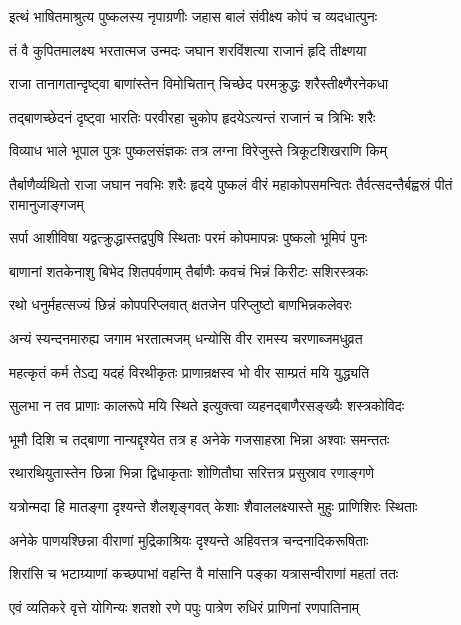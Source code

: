 \twolineshloka
{इत्थं भाषितमाश्रुत्य पुष्कलस्य नृपाग्रणीः}
{जहास बालं संवीक्ष्य कोपं च व्यदधात्पुनः}%

\twolineshloka
{तं वै कुपितमालक्ष्य भरतात्मज उन्मदः}
{जघान शरविंशत्या राजानं हृदि तीक्ष्णया}%

\twolineshloka
{राजा तानागतान्दृष्ट्वा बाणांस्तेन विमोचितान्}
{चिच्छेद परमक्रुद्धः शरैस्तीक्ष्णैरनेकधा}%

\twolineshloka
{तद्बाणच्छेदनं दृष्ट्वा भारतिः परवीरहा}
{चुकोप हृदयेऽत्यन्तं राजानं च त्रिभिः शरैः}%

\twolineshloka
{विव्याध भाले भूपाल पुत्रः पुष्कलसंज्ञकः}
{तत्र लग्ना विरेजुस्ते त्रिकूटशिखराणि किम्}%


\threelineshloka
{तैर्बाणैर्व्यथितो राजा जघान नवभिः शरैः}
{हृदये पुष्कलं वीरं महाकोपसमन्वितः}
{तैर्वत्सदन्तैर्बह्वस्रं पीतं रामानुजाङ्गजम्}%

\twolineshloka
{सर्पा आशीविषा यद्वत्क्रुद्धास्तद्वपुषि स्थिताः}
{परमं कोपमापन्नः पुष्कलो भूमिपं पुनः}%

\twolineshloka
{बाणानां शतकेनाशु बिभेद शितपर्वणाम्}
{तैर्बाणैः कवचं भिन्नं किरीटः सशिरस्त्रकः}%

\twolineshloka
{रथो धनुर्महत्सज्यं छिन्नं कोपपरिप्लवात्}
{क्षतजेन परिप्लुष्टो बाणभिन्नकलेवरः}%

\twolineshloka
{अन्यं स्यन्दनमारुह्य जगाम भरतात्मजम्}
{धन्योसि वीर रामस्य चरणाब्जमधुव्रत}%

\twolineshloka
{महत्कृतं कर्म तेऽद्य यदहं विरथीकृतः}
{प्राणान्रक्षस्व भो वीर साम्प्रतं मयि युद्ध्यति}%

\twolineshloka
{सुलभा न तव प्राणाः कालरूपे मयि स्थिते}
{इत्युक्त्वा व्यहनद्बाणैरसङ्ख्यैः शस्त्रकोविदः}%

\twolineshloka
{भूमौ दिशि च तद्बाणा नान्यद्दृश्येत तत्र ह}
{अनेके गजसाहस्रा भिन्ना अश्वाः समन्ततः}%

\twolineshloka
{रथारथियुतास्तेन छिन्ना भिन्ना द्विधाकृताः}
{शोणितौघा सरित्तत्र प्रसुस्राव रणाङ्गणे}%

\twolineshloka
{यत्रोन्मदा हि मातङ्गा दृश्यन्ते शैलशृङ्गवत्}
{केशाः शैवाललक्ष्यास्ते मुहुः प्राणिशिरः स्थिताः}%

\twolineshloka
{अनेके पाणयश्छिन्ना वीराणां मुद्रिकाश्रियः}
{दृश्यन्ते अहिवत्तत्र चन्दनादिकरूषिताः}%

\twolineshloka
{शिरांसि च भटाग्र्याणां कच्छपाभां वहन्ति वै}
{मांसानि पङ्का यत्रासन्वीराणां महतां ततः}%

\twolineshloka
{एवं व्यतिकरे वृत्ते योगिन्यः शतशो रणे}
{पपुः पात्रेण रुधिरं प्राणिनां रणपातिनाम्}%

